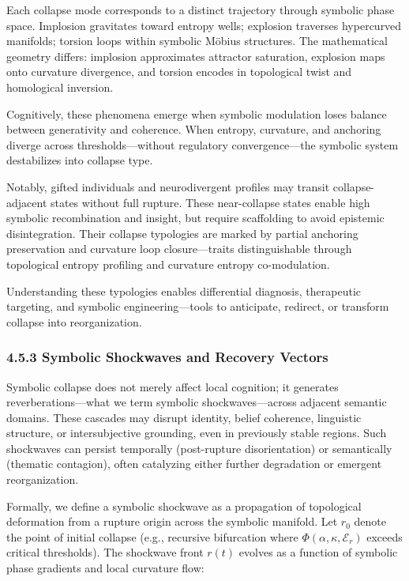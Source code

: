Each collapse mode corresponds to a distinct trajectory through symbolic phase space. Implosion gravitates toward entropy wells; explosion traverses hypercurved manifolds; torsion loops within symbolic Möbius structures. The mathematical geometry differs: implosion approximates attractor saturation, explosion maps onto curvature divergence, and torsion encodes in topological twist and homological inversion.

Cognitively, these phenomena emerge when symbolic modulation loses balance between generativity and coherence. When entropy, curvature, and anchoring diverge across thresholds—without regulatory convergence—the symbolic system destabilizes into collapse type.

Notably, gifted individuals and neurodivergent profiles may transit collapse-adjacent states without full rupture. These near-collapse states enable high symbolic recombination and insight, but require scaffolding to avoid epistemic disintegration. Their collapse typologies are marked by partial anchoring preservation and curvature loop closure—traits distinguishable through topological entropy profiling and curvature entropy co-modulation.

Understanding these typologies enables differential diagnosis, therapeutic targeting, and symbolic engineering—tools to anticipate, redirect, or transform collapse into reorganization.

\subsubsection*{4.5.3 Symbolic Shockwaves and Recovery Vectors}

Symbolic collapse does not merely affect local cognition; it generates reverberations—what we term symbolic shockwaves—across adjacent semantic domains. These cascades may disrupt identity, belief coherence, linguistic structure, or intersubjective grounding, even in previously stable regions. Such shockwaves can persist temporally (post-rupture disorientation) or semantically (thematic contagion), often catalyzing either further degradation or emergent reorganization.

Formally, we define a symbolic shockwave as a propagation of topological deformation from a rupture origin across the symbolic manifold. Let $r_0$ denote the point of initial collapse (e.g., recursive bifurcation where $\Phi(\alpha, \kappa, \mathcal{E}_r)$ exceeds critical thresholds). The shockwave front $r(t)$ evolves as a function of symbolic phase gradients and local curvature flow:

